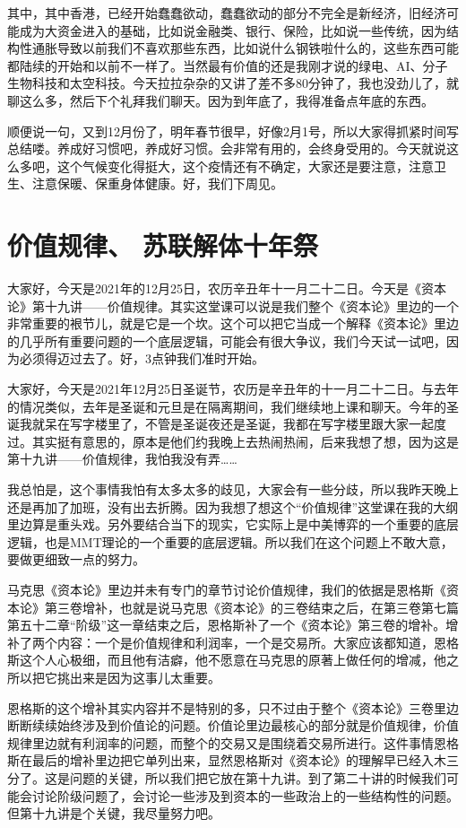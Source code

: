 \documentclass[UTF8, 12pt, a4paper]{ctexrep}
\begin{document}
其中，其中香港，已经开始蠢蠢欲动，蠢蠢欲动的部分不完全是新经济，旧经济可能成为大资金进入的基础，比如说金融类、银行、保险，比如说一些传统，因为结构性通胀导致以前我们不喜欢那些东西，比如说什么钢铁啦什么的，这些东西可能都陆续的开始和以前不一样了。当然最有价值的还是我刚才说的绿电、AI、分子生物科技和太空科技。今天拉拉杂杂的又讲了差不多80分钟了，我也没劲儿了，就聊这么多，然后下个礼拜我们聊天。因为到年底了，我得准备点年底的东西。

顺便说一句，又到12月份了，明年春节很早，好像2月1号，所以大家得抓紧时间写总结喽。养成好习惯吧，养成好习惯。会非常有用的，会终身受用的。今天就说这么多吧，这个气候变化得挺大，这个疫情还有不确定，大家还是要注意，注意卫生、注意保暖、保重身体健康。好，我们下周见。

\section{价值规律、 苏联解体十年祭}

大家好，今天是2021年的12月25日，农历辛丑年十一月二十二日。今天是《资本论》第十九讲——价值规律。其实这堂课可以说是我们整个《资本论》里边的一个非常重要的裉节儿，就是它是一个坎。这个可以把它当成一个解释《资本论》里边的几乎所有重要问题的一个底层逻辑，可能会有很大争议，我们今天试一试吧，因为必须得迈过去了。好，3点钟我们准时开始。

大家好，今天是2021年12月25日圣诞节，农历是辛丑年的十一月二十二日。与去年的情况类似，去年是圣诞和元旦是在隔离期间，我们继续地上课和聊天。今年的圣诞我就呆在写字楼里了，不管是圣诞夜还是圣诞，我都在写字楼里跟大家一起度过。其实挺有意思的，原本是他们约我晚上去热闹热闹，后来我想了想，因为这是第十九讲——价值规律，我怕我没有弄……

我总怕是，这个事情我怕有太多太多的歧见，大家会有一些分歧，所以我昨天晚上还是再加了加班，没有出去折腾。因为我想了想这个“价值规律”这堂课在我的大纲里边算是重头戏。另外要结合当下的现实，它实际上是中美博弈的一个重要的底层逻辑，也是MMT理论的一个重要的底层逻辑。所以我们在这个问题上不敢大意，要做更细致一点的努力。

马克思《资本论》里边并未有专门的章节讨论价值规律，我们的依据是恩格斯《资本论》第三卷增补，也就是说马克思《资本论》的三卷结束之后，在第三卷第七篇第五十二章“阶级”这一章结束之后，恩格斯补了一个《资本论》第三卷的增补。增补了两个内容：一个是价值规律和利润率，一个是交易所。大家应该都知道，恩格斯这个人心极细，而且他有洁癖，他不愿意在马克思的原著上做任何的增减，他之所以把它挑出来是因为这事儿太重要。

恩格斯的这个增补其实内容并不是特别的多，只不过由于整个《资本论》三卷里边断断续续始终涉及到价值论的问题。价值论里边最核心的部分就是价值规律，价值规律里边就有利润率的问题，而整个的交易又是围绕着交易所进行。这件事情恩格斯在最后的增补里边把它单列出来，显然恩格斯对《资本论》的理解早已经入木三分了。这是问题的关键，所以我们把它放在第十九讲。到了第二十讲的时候我们可能会讨论阶级问题了，会讨论一些涉及到资本的一些政治上的一些结构性的问题。但第十九讲是个关键，我尽量努力吧。
\end{document}
